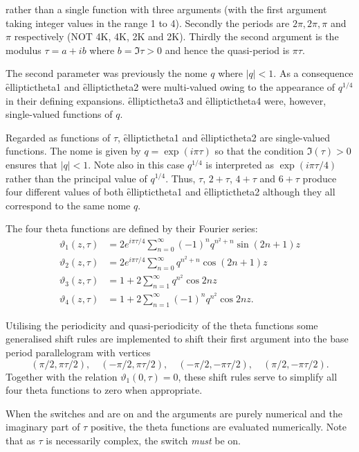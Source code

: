 rather than a single function with three arguments (with the first argument
taking integer values in the range 1 to 4).
Secondly the periods are $2\pi, 2\pi, \pi$ and $\pi$ respectively
(NOT 4K, 4K, 2K and 2K).
Thirdly the second argument is the modulus $\tau = a+i b$ where $b=\Im\tau>0$
and hence the quasi-period is $\pi\tau$.

The second parameter was previously the nome $q$
where $|q|<1$. As a consequence \f{elliptictheta1} and \f{elliptictheta2} were
multi-valued owing to the appearance of $q^{1/4}$ in their defining expansions.
\f{elliptictheta3} and \f{elliptictheta4} were, however, single-valued
functions of $q$.

Regarded as functions of $\tau$,
\f{elliptictheta1} and \f{elliptictheta2} are single-valued functions. The nome
is given by $q = \exp(i\pi\tau)$  so that the condition $\Im(\tau)>0$ ensures
that $|q| < 1$. Note also  in this case $q^{1/4}$ is interpreted as
$\exp(i\pi\tau/4)$ rather than the principal value of $q^{1/4}$.
Thus, $\tau$, $2+\tau$, $4+\tau$ and $6+\tau$ produce four different values of
both \f{elliptictheta1} and \f{elliptictheta2} although they all correspond to
the same nome $q$.

The four theta functions are defined by their Fourier series:
\begin{align*}
  \vartheta_1(z,\tau) & = 2 e^{i\pi\tau/4}\sum_{n=0}^\infty (-1)^nq^{n^2+n} \sin(2n+1)z\\
\vartheta_2(z,\tau) & = 2 e^{i\pi\tau/4}\sum_{n=0}^\infty q^{n^2+n} \cos(2n+1)z\\
\vartheta_3(z,\tau) & = 1 +2\sum_{n=1}^\infty q^{n^2} \cos 2n z\\
\vartheta_4(z,\tau) & = 1 +2\sum_{n=1}^\infty (-1)^n q^{n^2} \cos 2n z.
\end{align*}

Utilising the periodicity and quasi-periodicity of the theta functions
some generalised shift rules are implemented to shift their first argument
into the base period parallelogram with vertices
\[(\pi/2, \pi\tau/2),\quad (-\pi/2, \pi\tau/2),\quad (-\pi/2, -\pi\tau/2),
\quad (\pi/2, -\pi\tau/2).\]
Together with the relation $\vartheta_1(0,\tau)=0$,  these shift rules serve to
simplify all four theta functions to zero when appropriate.

When the switches  and  are on and the arguments are
purely numerical and the imaginary part of $\tau$ positive,
the theta functions are evaluated numerically. Note that as $\tau$ is
necessarily complex, the switch  \emph{must} be on.

